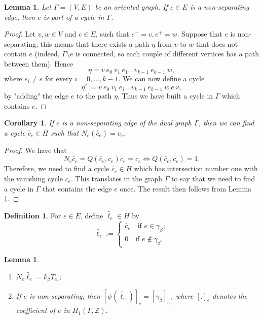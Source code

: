 \documentclass[a4paper,12 pt,titlepage,twoside]{book}
\newcommand{\numberset}{\mathbb}
\newcommand{\Z}{\numberset{Z}}
\theoremstyle{plain}
\theoremstyle{theorem}
\newtheorem{lemma}[thm]{Lemma}
\newtheorem{cor}[thm]{Corollary}
\theoremstyle{definition}
\newtheorem{defn}[thm]{Definition}
\theoremstyle{remark}
\begin{document}
	\begin{lemma}\label{lem: bridge cycle}
		Let $\Gamma=(V,E)$ be an oriented graph. If $e \in E$ is a non-separating edge, then $e$ is part of a cycle in $\Gamma$.
	\end{lemma}
	\begin{proof}
		Let $v,w \in V$ and $e \in E$, such that $e^-=v, e^+=w$. Suppose that $e$ is non-separating; this means that there exists a path $\eta$ from $v$ to $w$ that does not contain $e$ (indeed, $\Gamma\setminus e$ is connected, so each couple of different vertices has a path between them). Hence $$\eta = v \ e_0\ v_1\ e_1\dots v_{k-1}\ e_{k-1}\ w,$$ where $e_i \neq e$ for every $i=0, \dots, k-1.$ We can now define a cycle $$\eta' := v\ e_0\ v_1\ e_1 \dots v_{k-1} \ e_{k-1}\ w\ e \ v,$$ by "adding" the edge $e$ to the path $\eta$. Thus we have built a cycle in $\Gamma$ which contains $e$.
	\end{proof}
	\begin{cor}
		If $e$ is a non-separating edge of the dual graph $\Gamma$, then we can find a cycle $\widetilde{c_e}\in H$ such that $N_e(\widetilde{c_e}) = c_e.$
	\end{cor}
	\begin{proof}
		We have that $$N_e\widetilde{c_e} = Q(\widetilde{c_e}, c_e)c_e = c_e \Leftrightarrow Q(\widetilde{c_e}, c_e)=1.$$ Therefore, we need to find a cycle $\widetilde{c_e} \in H$ which has intersection number one with the vanishing cycle $c_e$. This translates in the graph $\Gamma$ to say that we need to find a cycle in $\Gamma$ that contains the edge $e$ once. The result then follows from Lemma \ref{lem: bridge cycle}.
	\end{proof}
	\begin{defn}\label{def: ell tilde}
		For $e \in E$, define $\widetilde{\ell_e} \in H$ by $$\widetilde{\ell_e} := \begin{cases}
		\widetilde{c_e} \quad \text{if } e \in \gamma_\beta; \\ 0 \quad \text{if } e \notin \gamma_\beta.
		\end{cases}$$\end{defn}
	\begin{lemma}\label{lem: 1}
		\begin{enumerate}[label=(\arabic*)] \label{[.]_e}\noindent 
			\item $N_e\widetilde{\ell_e} = k_\beta T_{c_e}$;
			\item If $e$ is non-separating, then $[\psi(\widetilde{\ell_e})]_e = [\gamma_\beta]_e,$ where $[.]_e$ denotes the coefficient of $e$ in $H_1(\Gamma,\Z).$
		\end{enumerate}
	\end{lemma}
\end{document}
